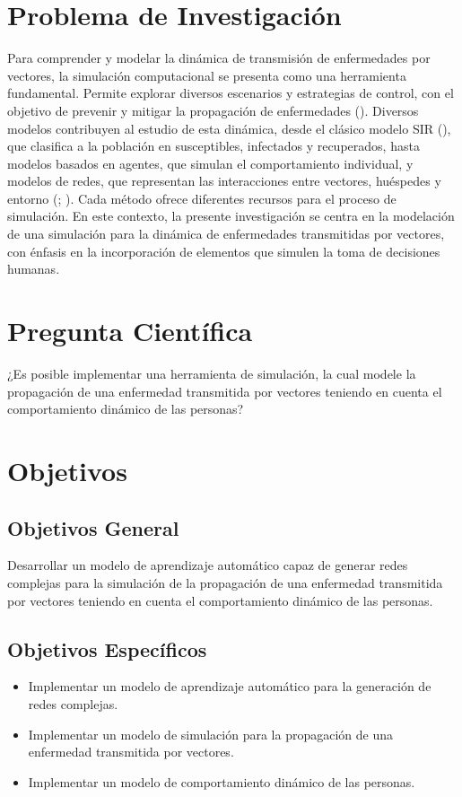 \section{Problema de Investigaci\'on}
Para comprender y modelar la dinámica de transmisión 
de enfermedades por vectores, la simulación 
computacional se presenta como una herramienta 
fundamental. Permite explorar diversos escenarios 
y estrategias de control, con el objetivo de 
prevenir y mitigar la propagación de enfermedades 
(\cite{ferguson2006strategies}). Diversos modelos contribuyen 
al estudio de esta dinámica, desde el clásico modelo 
SIR (\cite{kermack1927contribution}), que clasifica a la 
población en susceptibles, infectados y recuperados, 
hasta modelos basados en agentes, que simulan el 
comportamiento individual, y modelos de redes, que 
representan las interacciones entre vectores, 
huéspedes y entorno (\cite{ferguson2006strategies}; \cite{balcan2009multiscale}). Cada método ofrece diferentes 
recursos para el proceso de simulación. En este 
contexto, la presente investigación se centra 
en la modelación de una simulación para la 
dinámica de enfermedades transmitidas por 
vectores, con énfasis en la incorporación de 
elementos que simulen la toma de decisiones 
humanas.

\section{Pregunta Cient\'ifica}
¿Es posible implementar una herramienta de simulación, la cual modele
la propagación de una enfermedad transmitida por vectores teniendo en cuenta el
comportamiento dinámico de las personas?

\section{Objetivos}
\subsection{Objetivos General}
Desarrollar un modelo de aprendizaje autom\'atico capaz de generar redes complejas para la simulación de la propagación de una enfermedad transmitida por vectores teniendo en cuenta el comportamiento dinámico de las personas.

\subsection{Objetivos Espec\'ificos}
\begin{itemize}
    \item Implementar un modelo de aprendizaje autom\'atico para la generación de redes complejas.
    \item Implementar un modelo de simulación para la propagación de una enfermedad transmitida por vectores.
    \item Implementar un modelo de comportamiento dinámico de las personas.  
\end{itemize}

